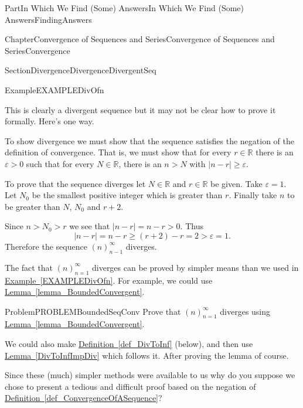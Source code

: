\documentclass[oneside,10pt,]{book}
\newcommand{\xreffont}{\relax}
\numberwithin{equation}{part}
\newcommand{\abs}[1]{\left|#1\right|}
\newcommand{\eps}{\varepsilon}
\newcommand{\RR}{\mathbb {R}}
\newcommand{\gt}{>}
\begin{document}
\begin{partptx}{Part}{In Which We Find (Some) Answers}{}{In Which We Find (Some) Answers}{}{}{FindingAnswers}
\begin{chapterptx}{Chapter}{Convergence of Sequences and Series}{}{Convergence of Sequences and Series}{}{}{Convergence}
\begin{sectionptx}{Section}{Divergence}{}{Divergence}{}{}{DivergentSeq}
\begin{example}{Example}{}{EXAMPLEDivOfn}
\par
This is clearly a divergent sequence but it may not be clear how to prove it formally. Here's one way.%
\par
To show divergence we must show that the sequence satisfies the negation of the definition of convergence. That is, we must show that for every \(r\in\RR\) there is an \(\eps>0\) such that for every \(N\in\RR\), there is an \(n>N\) with \(\left|n-r\right|\ge\eps\).%
\par
To prove that the sequence diverges let \(N\in \RR \) and \(r\in \RR \) be given. Take \(\eps=1\). Let \(N_0\) be the smallest positive integer which is greater than \(r\). Finally take \(n\) to be greater than \(N\), \(N_0\) and \(r+2\).%
\par
Since \(n\gt N_0 \gt r\) we see that \(\abs{n-r}=n-r\gt 0\). Thus%
\begin{equation}
\abs{n-r}=n-r\ge(r+2)-r=2>\eps=1\text{.}\label{EQUATIONIntSerDiv}
\end{equation}
Therefore the sequence \(\left(n\right)_{n-1}^\infty \) diverges.%
\end{example}
The fact that \(\left(n\right)_{n=1}^\infty \) diverges can be proved by simpler means than we used in \hyperref[EXAMPLEDivOfn]{Example~{\xreffont\ref{EXAMPLEDivOfn}}}. For example, we could  use \hyperref[lemma_BoundedConvergent]{Lemma~{\xreffont\ref{lemma_BoundedConvergent}}}.%
\begin{problem}{Problem}{}{PROBLEMBoundedSeqConv}%
Prove that \(\left(n\right)_{n=1}^\infty \) diverges using \hyperref[lemma_BoundedConvergent]{Lemma~{\xreffont\ref{lemma_BoundedConvergent}}}.%
\end{problem}
We could also  make \hyperref[def_DivToInf]{Definition~{\xreffont\ref{def_DivToInf}}} (below), and then use \hyperref[DivToInfImpDiv]{Lemma~{\xreffont\ref{DivToInfImpDiv}}} which follows it. After proving the lemma of course.%
\par
Since these (much) simpler methods were available to us why do you suppose we chose to present a tedious and difficult proof based on the negation of \hyperref[def_ConvergenceOfASequence]{Definition~{\xreffont\ref{def_ConvergenceOfASequence}}}?%
\par

\end{sectionptx}
\end{chapterptx}
\end{partptx}
\end{document}
